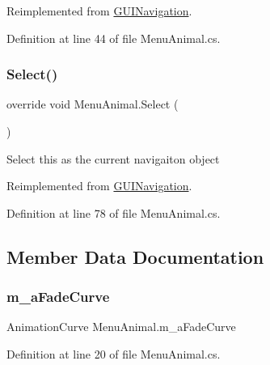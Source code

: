 Reimplemented from \mbox{\hyperlink{class_g_u_i_navigation_aad668226e400889bceea3914750b949e}{G\+U\+I\+Navigation}}.



Definition at line 44 of file Menu\+Animal.\+cs.

\mbox{\label{class_menu_animal_ae910dac4feb11d1d3c911bd1823075cc}} 
\subsubsection{\texorpdfstring{Select()}{Select()}}
{\footnotesize\ttfamily override void Menu\+Animal.\+Select (\begin{DoxyParamCaption}{ }\end{DoxyParamCaption})\hspace{0.3cm}{\ttfamily [virtual]}}



Select this as the current navigaiton object 



Reimplemented from \mbox{\hyperlink{class_g_u_i_navigation_a4c40fc7986ac35247bc8f77c615e7847}{G\+U\+I\+Navigation}}.



Definition at line 78 of file Menu\+Animal.\+cs.



\subsection{Member Data Documentation}
\mbox{\label{class_menu_animal_ad5b6ceaf1c5e8e4e95202bd736aa0dec}} 
\subsubsection{\texorpdfstring{m\+\_\+a\+Fade\+Curve}{m\_aFadeCurve}}
{\footnotesize\ttfamily Animation\+Curve Menu\+Animal.\+m\+\_\+a\+Fade\+Curve}



Definition at line 20 of file Menu\+Animal.\+cs.

\mbox{\label{class_menu_animal_a1f992fbd56582de1dd6c775df7a42a9d}} 
